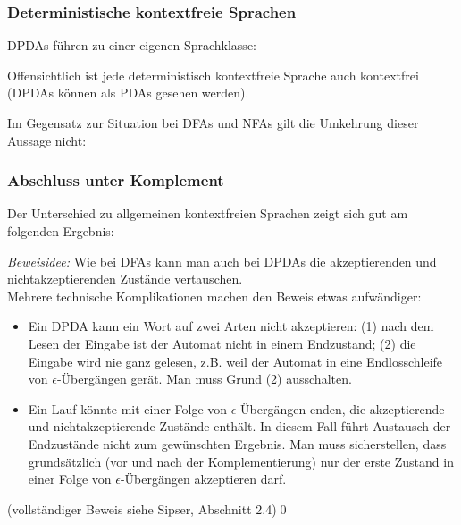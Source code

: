 \documentclass[aspectratio=1610,onlymath]{beamer}
\begin{document}
\begin{frame}\frametitle{Deterministische kontextfreie Sprachen}

DPDAs führen zu einer eigenen Sprachklasse:


Offensichtlich ist jede deterministisch kontextfreie Sprache auch kontextfrei (DPDAs können als PDAs gesehen werden).
\medskip\pause

Im Gegensatz zur Situation bei DFAs und NFAs gilt die Umkehrung dieser Aussage nicht:\medskip


\end{frame}

\begin{frame}\frametitle{Abschluss unter Komplement}

Der Unterschied zu allgemeinen kontextfreien Sprachen zeigt sich gut am folgenden Ergebnis:

\medskip

\emph{Beweisidee: } Wie bei DFAs kann man auch bei DPDAs die akzeptierenden und nichtakzeptierenden Zustände 
vertauschen.\\
Mehrere technische Komplikationen machen den Beweis etwas aufwändiger:

{\tiny
\begin{itemize}
\item Ein DPDA kann ein Wort auf zwei Arten nicht akzeptieren: (1) nach dem Lesen der Eingabe ist der Automat
nicht in einem Endzustand; (2) die Eingabe wird nie ganz gelesen, z.B. weil der Automat in eine Endlosschleife von 
$\epsilon$-Übergängen gerät. Man muss Grund (2) ausschalten.
\item Ein Lauf
könnte mit einer Folge von $\epsilon$-Übergängen enden, die akzeptierende und nichtakzeptierende Zustände enthält. In diesem Fall führt Austausch der Endzustände nicht zum gewünschten Ergebnis. Man
muss sicherstellen, dass grundsätzlich (vor und nach der Komplementierung) nur der erste Zustand in einer Folge von
$\epsilon$-Übergängen akzeptieren darf.
\end{itemize}}
{\tiny (vollständiger Beweis siehe Sipser, Abschnitt 2.4)}\qed

\end{frame}
\end{document}

